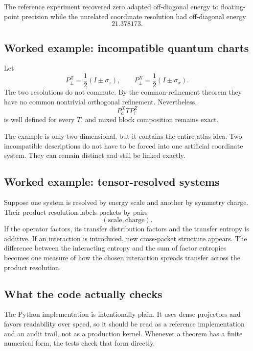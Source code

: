 \documentclass[11pt]{article}
\theoremstyle{definition}
\theoremstyle{remark}
\begin{document}
The reference experiment recovered zero adapted off-diagonal energy to floating-point precision while the unrelated coordinate resolution had off-diagonal energy
\[
21.378173.
\]

\subsection{Worked example: incompatible quantum charts}

Let
\[
P_\pm^Z=\frac12(I\pm\sigma_z),
\qquad
P_\pm^X=\frac12(I\pm\sigma_x).
\]
The two resolutions do not commute.  By the common-refinement theorem they have no common nontrivial orthogonal refinement.  Nevertheless,
\[
P_a^XTP_i^Z
\]
is well defined for every \(T\), and mixed block composition remains exact.

The example is only two-dimensional, but it contains the entire atlas idea.  Two incompatible descriptions do not have to be forced into one artificial coordinate system.  They can remain distinct and still be linked exactly.

\subsection{Worked example: tensor-resolved systems}

Suppose one system is resolved by energy scale and another by symmetry charge.  Their product resolution labels packets by pairs
\[
(\text{scale},\text{charge}).
\]
If the operator factors, its transfer distribution factors and the transfer entropy is additive.  If an interaction is introduced, new cross-packet structure appears.  The difference between the interacting entropy and the sum of factor entropies becomes one measure of how the chosen interaction spreads transfer across the product resolution.

\subsection{What the code actually checks}

The Python implementation is intentionally plain.  It uses dense projectors and favors readability over speed, so it should be read as a reference implementation and an audit trail, not as a production kernel.  Whenever a theorem has a finite numerical form, the tests check that form directly.
\end{document}

